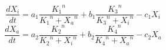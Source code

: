 \documentclass[preview]{standalone}
\begin{document}
$$\frac{dX_i}{dt} = a_1 \frac{{K_1}^n}{{K_1}^n+{X_a}^n} + b_1 \frac{{K_3}^n}{{K_3}^n+{X_i}^n} - c_1 X_i $$
$$\frac{dX_a}{dt} = a_2 \frac{{K_2}^n}{{K_2}^n+{X_i}^n} + b_2 \frac{{K_4}^n}{{K_4}^n+{X_a}^n} - c_2 X_a $$
\end{document}

